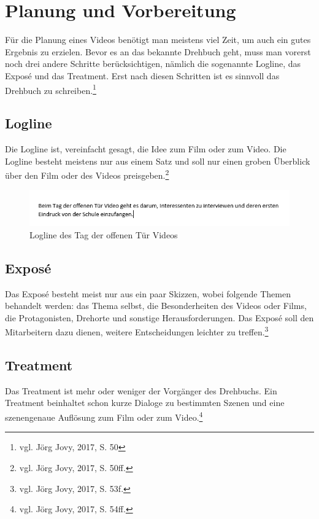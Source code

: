 \section{Planung und Vorbereitung}
Für die Planung eines Videos benötigt man meistens viel Zeit, um auch ein gutes Ergebnis zu erzielen. Bevor es an das bekannte Drehbuch geht, muss man vorerst noch drei andere Schritte berücksichtigen, nämlich die sogenannte Logline, das Expos\'{e} und das Treatment. Erst nach diesen Schritten ist es sinnvoll das Drehbuch zu schreiben.\footnote{\label{foot}vgl. Jörg Jovy, 2017, S. 50}
\subsection{Logline}
Die Logline ist, vereinfacht gesagt, die Idee zum Film oder zum Video. Die Logline besteht meistens nur aus einem Satz und soll nur einen groben Überblick über den Film oder des Videos preisgeben.\footnote{\label{foot}vgl. Jörg Jovy, 2017, S. 50ff.}
\begin{figure}[H]
	\centering
	\includegraphics[width=1.0\textwidth]{abb26} 
	\caption{Logline des Tag der offenen Tür Videos}
\end{figure}
\subsection{Expos\'{e}}
Das Expos\'{e} besteht meist nur aus ein paar Skizzen, wobei folgende Themen behandelt werden: das Thema selbst, die Besonderheiten des Videos oder Films, die Protagonisten, Drehorte und sonstige Herausforderungen. Das Expos\'{e} soll den Mitarbeitern dazu dienen, weitere Entscheidungen leichter zu treffen.\footnote{\label{foot}vgl. Jörg Jovy, 2017, S. 53f.}
\subsection{Treatment}
Das Treatment ist mehr oder weniger der Vorgänger des Drehbuchs. Ein Treatment beinhaltet schon kurze Dialoge zu bestimmten Szenen und eine szenengenaue Auflösung zum Film oder zum Video.\footnote{\label{foot}vgl. Jörg Jovy, 2017, S. 54ff.}
